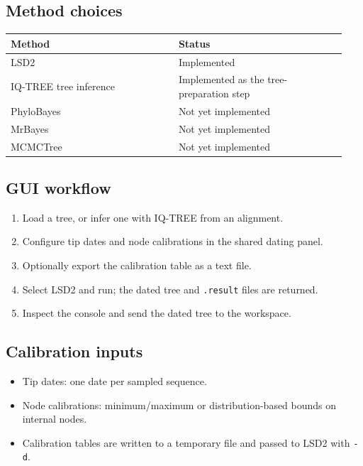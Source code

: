 \documentclass[11pt]{report}
\begin{document}
\subsection{Method choices}

{\footnotesize
\begin{longtable}{@{}>{\raggedright\arraybackslash}p{0.47\linewidth}>{\raggedright\arraybackslash}p{0.47\linewidth}@{}}
\toprule
Method & Status \\
\midrule
\endhead
LSD2 & Implemented \\
IQ-TREE tree inference & Implemented as the tree-preparation step \\
PhyloBayes & Not yet implemented \\
MrBayes & Not yet implemented \\
MCMCTree & Not yet implemented \\
\bottomrule
\end{longtable}
}

\subsection{GUI workflow}

\begin{enumerate}
  \item Load a tree, or infer one with IQ-TREE from an alignment.
  \item Configure tip dates and node calibrations in the shared dating panel.
  \item Optionally export the calibration table as a text file.
  \item Select LSD2 and run; the dated tree and \texttt{.\allowbreak result} files are returned.
  \item Inspect the console and send the dated tree to the workspace.
\end{enumerate}

\subsection{Calibration inputs}

\begin{itemize}
  \item Tip dates: one date per sampled sequence.
  \item Node calibrations: minimum/maximum or distribution-based bounds on internal nodes.
  \item Calibration tables are written to a temporary file and passed to LSD2 with \texttt{-d}.
\end{itemize}
\end{document}
